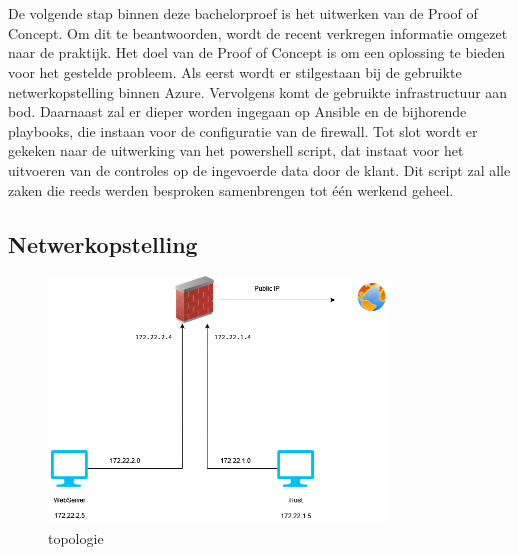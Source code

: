 \graphicspath{ {./graphics/} }
\chapter{}%

De volgende stap binnen deze bachelorproef is het uitwerken van de Proof of Concept. Om dit te beantwoorden, wordt de recent verkregen informatie omgezet naar de praktijk. Het doel van de Proof of Concept is om een oplossing te bieden voor het gestelde probleem. Als eerst wordt er stilgestaan bij de gebruikte netwerkopstelling binnen Azure.
Vervolgens komt de gebruikte infrastructuur aan bod. Daarnaast zal er dieper worden ingegaan op Ansible en de bijhorende playbooks, die instaan voor de configuratie van de firewall. Tot slot wordt er gekeken naar de uitwerking van het powershell script, dat instaat voor het uitvoeren van de controles op de ingevoerde data door de klant. Dit script zal alle zaken die reeds werden besproken samenbrengen tot één werkend geheel. 

\newpage

\section{Netwerkopstelling}
\begin{figure}[ht]
    \centering
    \includegraphics[width=90mm]{bachproef/graphics/topologie.drawio.png}
    \caption{topologie}
    \label{fig:topologie}
\end{figure}

